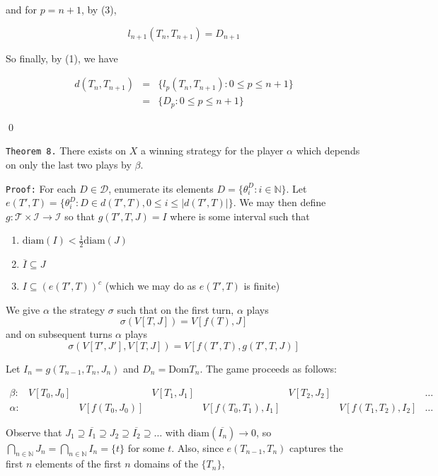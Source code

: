\documentclass[12pt]{article}
\theoremstyle{plain}
\theoremstyle{definition}
\theoremstyle{remark}
\begin{document}
and for $p=n+1$, by (3),

\[l_{n+1}(T_n,T_{n+1}) = D_{n+1}\]

So finally, by (1), we have

\[
\begin{array}{rcll}
d(T_n,T_{n+1})
& = &
\{l_p(T_n,T_{n+1}): 0 \leq p \leq n+1\}
\\ & = &
\{D_p : 0 \leq p \leq n+1\}
\end{array}
\]

\qed

\newpage

\texttt{Theorem 8.} There exists on $X$ a winning strategy for the player $\alpha$ which depends on only the last two plays by $\beta$.

\texttt{Proof:} For each $D \in \mathcal{D}$, enumerate its elements $D=\{\theta_i^D : i \in \mathbb{N}\}$.  Let $e(T',T) = \{\theta_i^D : D \in d(T',T), 0 \leq i \leq |d(T',T)|\}$. We may then define $g: \mathcal{T}\times\mathcal{I} \to \mathcal{I}$ so that $g(T',T,J)=I$ where is some interval such that

	\begin{enumerate}
	\item $\textrm{diam}(I)<\frac{1}{2}\textrm{diam}(J)$
	\item $\overline{I} \subseteq J$
	\item $I \subseteq (e(T',T))^c$ (which we may do as $e(T',T)$ is finite)
	\end{enumerate}
	
We give $\alpha$ the strategy $\sigma$ such that on the first turn, $\alpha$ plays \[\sigma(V[T,J])=V[f(T),J]\] and on subsequent turns $\alpha$ plays \[\sigma(V[T',J'],V[T,J])=V[f(T',T),g(T',T,J)]\]

Let $I_n=g(T_{n-1},T_n,J_n)$ and $D_n=\textrm{Dom}T_n$. The game proceeds as follows:

\[
\begin{array}{cccccccc}
\beta: & V[T_0,J_0] & & V[T_1,J_1] & & V[T_2,J_2] & & \dots \\
\alpha: & & V[f(T_0,J_0)] & & V[f(T_0,T_1),I_1] & & V[f(T_1,T_2),I_2] & \dots
\end{array}
\]

Observe that $J_1 \supseteq \overline{I_1} \supseteq J_2 \supseteq \overline{I_2} \supseteq \dots$ with $\textrm{diam}(\overline{I_n})\to 0$, so $\bigcap_{n\in\mathbb{N}} J_n = \bigcap_{n\in\mathbb{N}} I_n = \{t\}$ for some $t$. Also, since $e(T_{n-1},T_n)$ captures the first $n$ elements of the first $n$ domains of the $\{T_n\}$, 
\end{document}
